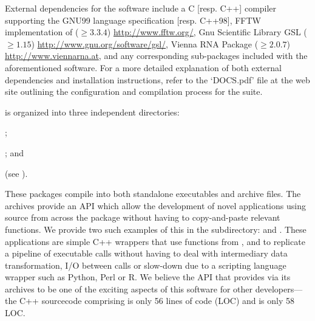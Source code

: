External dependencies for the software include a C [resp. C++]
compiler supporting the GNU99 language specification [resp. C++98],
FFTW implementation of \fft \citep{fftw05} ($\geq
3.3.4$) \url{http://www.fftw.org/}, Gnu Scientific Library GSL ($\geq
1.15$) \url{http://www.gnu.org/software/gsl/}, Vienna RNA Package
\citep{lorenz.amb11} ($\geq 2.0.7$) \url{http://www.viennarna.at}, and
any corresponding sub-packages included with the aforementioned
software. For a more detailed explanation of both external
dependencies and installation instructions, refer to the
`DOCS.pdf' file at the web site
outlining the configuration and compilation process for the \hermes
suite.

\hermes is organized into three independent directories:
\begin{inparaenum}[\em 1\upshape)]
\item \ffttwo; \item \rnamfpt; and \item \rnaeq (see
).
\end{inparaenum}
These packages compile into both
standalone executables and archive files. The archives provide an
API which allow the development of novel applications using source
from across the \hermes package without having to copy-and-paste
relevant functions. We provide two such examples of this in the
 subdirectory: \fftmfpt and \ffteq. These applications
are simple C++ wrappers that use functions from \ffttwo, \rnamfpt and
\rnaeq to replicate a pipeline of executable calls without having to
deal with intermediary data transformation, I/O between calls or
slow-down due to a scripting language wrapper such as Python, Perl or R.
We believe
the API that \hermes provides via its archives to be one of the exciting
aspects of this software for other developers---the C++ sourcecode comprising
\fftmfpt is only 56 lines of code (LOC) and \ffteq is only 58 LOC.

